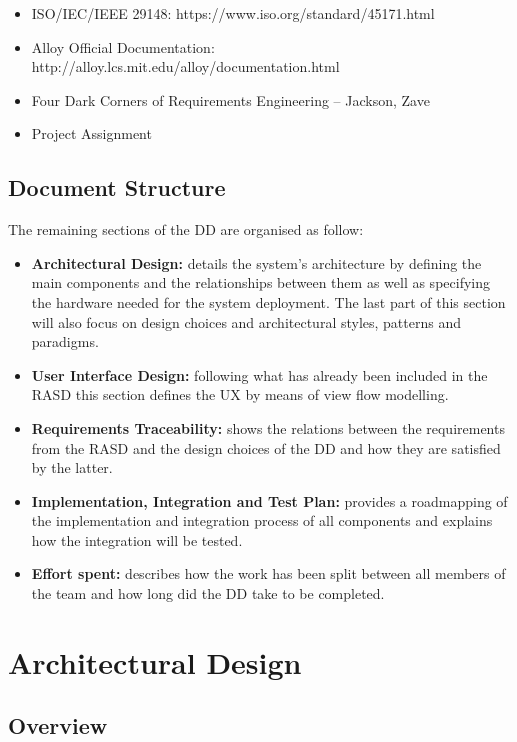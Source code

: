 \documentclass[titlepage]{article}
\begin{document}
\begin{itemize}
   	\item ISO/IEC/IEEE 29148: https://www.iso.org/standard/45171.html
	\item Alloy Official Documentation: http://alloy.lcs.mit.edu/alloy/documentation.html
   	\item Four Dark Corners of Requirements Engineering – Jackson, Zave
	\item Project Assignment
\end{itemize}


\subsection{Document Structure}
The remaining sections of the DD are organised as follow:
    \begin{itemize}
        \item {\bf Architectural Design: }details the system’s architecture by defining the main components and the relationships between them as well as specifying the hardware needed for the system deployment. The last part of this section will also focus on design choices and architectural styles, patterns and paradigms.
		\item {\bf User Interface Design:  }following what has already been included in the RASD this section defines the UX by means of view flow modelling.
		\item {\bf Requirements Traceability: }shows the relations between the requirements from the RASD and the design choices of the DD and how they are satisfied by the latter.
		\item {\bf Implementation, Integration and Test Plan: }provides a roadmapping of the implementation and integration process of all components and explains how the integration will be tested.
		\item {\bf Effort spent: }describes how the work has been split between all members of the team and how long did the DD take to be completed.
    \end{itemize}
\pagebreak



\section{Architectural Design}
\subsection{Overview}
\end{document}
